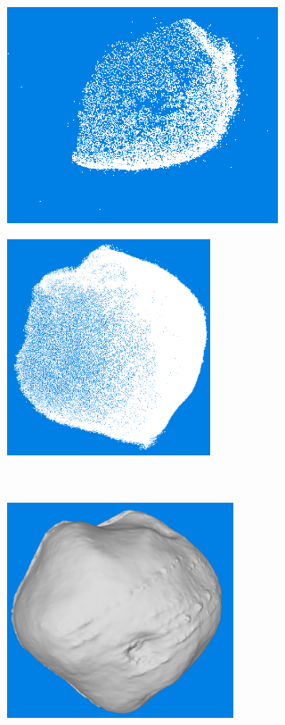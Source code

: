 \begin{figure}[htb]
    \centering
    \begin{subfigure}[b]{0.4\textwidth}
        \centering
        \includegraphics[width=\textwidth,height=6.4cm]{doc/thesis/0_figures/models_quality/100_1/120_100_1_points2.png}
        \caption{}
        \label{fig:recon_step_point}
    \end{subfigure}
    \begin{subfigure}[b]{0.4\textwidth}
        \centering
        \includegraphics[width=\textwidth,height=6.4cm]{doc/thesis/0_figures/models_quality/100_1/120_100_1_dense1.png}
        \caption{}
        \label{fig:recon_step_dense}
    \end{subfigure}
    \\
    \begin{subfigure}[b]{0.4\textwidth}
        \centering
        \includegraphics[width=\textwidth,height=6.4cm]{doc/thesis/0_figures/models_quality/100_1/120_100_1_mesh1.png}

\end{subfigure}
\end{figure}
